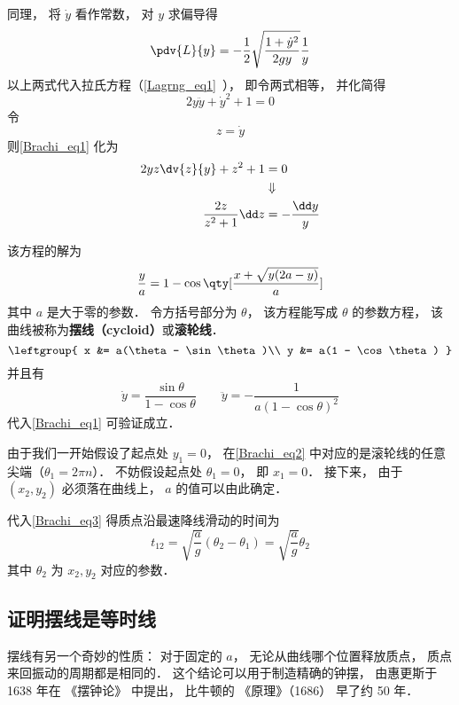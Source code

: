 同理， 将 $\dot y$ 看作常数， 对 $y$ 求偏导得
\begin{equation}
\pdv{L}{y} = -\frac{1}{2} \sqrt{\frac{1 + \dot{y}^2}{2gy}} \frac{1}{y}
\end{equation}
以上两式代入拉氏方程（\autoref{Lagrng_eq1}~）， 即令两式相等， 并化简得
\begin{equation}\label{Brachi_eq1}
2y\ddot y + \dot y^2 + 1 = 0
\end{equation}
令
\begin{equation}
z=\dot{y}
\end{equation}
则\autoref{Brachi_eq1} 化为
\begin{equation}
\begin{aligned}
2yz\dv{z}{y}+z^2+1&=0\\
&\Downarrow
\\
\frac{2z}{z^2+1}\dd z&=-\frac{\dd y}{y}
\end{aligned}
\end{equation}

该方程的解为
\begin{equation}
\frac{y}{a} = 1 - \cos\qty[\frac{x + \sqrt{y(2a-y)}}{a}]
\end{equation}
其中 $a$ 是大于零的参数． 令方括号部分为 $\theta$， 该方程能写成 $\theta$ 的参数方程， 该曲线被称为\textbf{摆线（cycloid）}或\textbf{滚轮线}． %
\begin{equation}\label{Brachi_eq2}
\leftgroup{
x &= a(\theta - \sin\theta)\\
y &= a(1 - \cos\theta)
}\end{equation}
并且有
\begin{equation}
\dot y = \frac{\sin\theta}{1 - \cos\theta} \qquad
\ddot y = -\frac{1}{a(1-\cos\theta)^2}
\end{equation}
代入\autoref{Brachi_eq1} 可验证成立．

由于我们一开始假设了起点处 $y_1 = 0$， 在\autoref{Brachi_eq2} 中对应的是滚轮线的任意尖端（$\theta_1 = 2\pi n$）． 不妨假设起点处 $\theta_1 = 0$， 即 $x_1 = 0$． 接下来， 由于 $(x_2, y_2)$ 必须落在曲线上，  $a$ 的值可以由此确定．

代入\autoref{Brachi_eq3} 得质点沿最速降线滑动的时间为
\begin{equation}\label{Brachi_eq4}
t_{12} = \sqrt{\frac{a}{g}}(\theta_2 - \theta_1) = \sqrt{\frac{a}{g}} \theta_2
\end{equation}
其中 $\theta_2$ 为 $x_2, y_2$ 对应的参数．


\subsection{证明摆线是等时线}
摆线有另一个奇妙的性质： 对于固定的 $a$， 无论从曲线哪个位置释放质点， 质点来回振动的周期都是相同的． 这个结论可以用于制造精确的钟摆， 由惠更斯于 1638 年在 《摆钟论》 中提出， 比牛顿的 《原理》（1686） 早了约 50 年．

